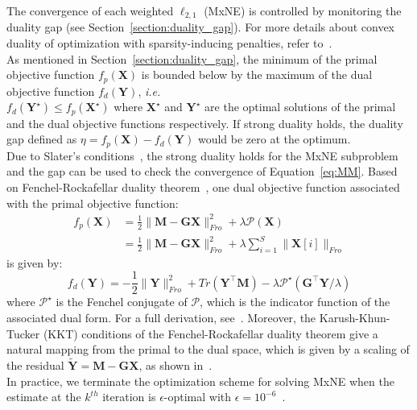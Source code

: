 The convergence of each weighted $\ell_{2,1}$ (MxNE) is controlled by monitoring the duality gap (see Section~\ref{section:duality_gap}). For more details about convex duality of optimization with sparsity-inducing penalties, refer to~\cite{bach2012optimization}.\\
As mentioned in Section~\ref{section:duality_gap}, the minimum of the primal objective function $f_p(\mathbf{X})$ is bounded below by the maximum of the dual objective function $f_d(\mathbf{Y})$, \textit{i.e.}\\
$f_d(\mathbf{Y}^\star)\leq f_p(\mathbf{X}^\star)$ where $\mathbf{X}^\star$ and $\mathbf{Y}^\star$ are the optimal solutions of the primal and the dual objective functions respectively. If strong duality holds, the duality gap defined as $\eta=f_p(\mathbf{X})-f_d(\mathbf{Y})$ would be zero at the optimum.\\
Due to Slater's conditions~\cite{Boyd_Vandenberghe04}, the strong duality holds for the MxNE subproblem and the gap can be used to check the convergence of Equation~\eqref{eq:MM}. Based on Fenchel-Rockafellar duality theorem~\cite{rockafellar:1997}, one dual objective function associated with the primal objective function:
\begin{equation}
\begin{split}
f_p(\mathbf{X}) & = \frac{1}{2}\|\mathbf{M}-\mathbf{GX}\|_{Fro}^2+\lambda\mathcal{P}(\mathbf{X}) \\
& = \frac{1}{2}\|\mathbf{M}-\mathbf{GX}\|_{Fro}^2+\lambda\sum_{i=1}^S\|\mathbf{X}[i]\|_{Fro}
\end{split}
\end{equation}
is given by:
\begin{equation}
f_d(\mathbf{Y})=-\frac{1}{2}\|\mathbf{Y}\|_{Fro}^2+Tr(\mathbf{Y}^\top\mathbf{M})-\lambda\mathcal{P}^\star(\mathbf{G}^\top\mathbf{Y}/\lambda)
\end{equation}
where $\mathcal{P}^\star$ is the Fenchel conjugate of $\mathcal{P}$, which is the indicator function of the associated dual form. For a full derivation, see~\cite{Gramfort_Kowalski_Hamalainen12}. Moreover, the Karush-Khun-Tucker (KKT) conditions of the Fenchel-Rockafellar duality theorem give a natural mapping from
the primal to the dual space, which is given by a scaling of the residual $\tilde{\mathbf{Y}}=\mathbf{M}-\mathbf{GX}$, as shown in~\cite{Gramfort_Kowalski_Hamalainen12}.\\
In practice, we terminate the optimization scheme for solving MxNE when the estimate at the $k^{th}$ iteration is $\epsilon$-optimal with $\epsilon=10^{-6}$~\cite{strohmeier-etal:16}.\\

